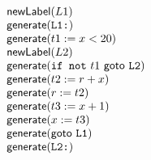 \documentclass{jarticle}
\begin{document}
\[
 \begin{array}{l}
  \mathsf{newLabel}(L1)\\
  \mathsf{generate}(\verb|L1:|)\\
  \mathsf{generate}(t1:=x<20)\\
  \mathsf{newLabel}(L2)\\
  \mathsf{generate}(\verb|if not|\ t1\ \mathsf{goto}\ \verb|L2|)\\
  \mathsf{generate}(t2:=r+x)\\
  \mathsf{generate}(r:=t2)\\
  \mathsf{generate}(t3:=x+1)\\
  \mathsf{generate}(x:=t3)\\
  \mathsf{generate}(\mathsf{goto}\ \verb|L1|)\\
  \mathsf{generate}(\verb|L2:|)
 \end{array}
\]
\end{document}
